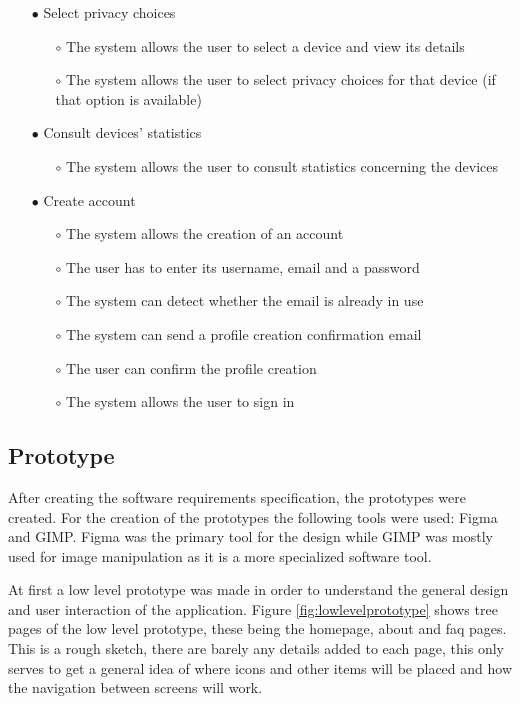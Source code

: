 \begin{itemize}
\begin{itemize}
    \end{itemize}
    \item[$\bullet$] Select privacy choices
    \begin{itemize}
        \item[$\circ$] The system allows the user to select a device and view its details
        \item[$\circ$] The system allows the user to select privacy choices for that device (if that option is available)
    \end{itemize}
    \item[$\bullet$] Consult devices' statistics
    \begin{itemize}
        \item[$\circ$] The system allows the user to consult statistics concerning the devices
    \end{itemize}
    \item[$\bullet$] Create account
    \begin{itemize}
        \item[$\circ$] The system allows the creation of an account
        \item[$\circ$] The user has to enter its username, email and a password
        \item[$\circ$] The system can detect whether the email is already in use
        \item[$\circ$] The system can send a profile creation confirmation email
        \item[$\circ$] The user can confirm the profile creation
        \item[$\circ$] The system allows the user to sign in
    \end{itemize}
\end{itemize}

\subsection{Prototype}

After creating the software requirements specification, the prototypes were
created. For the creation of the prototypes the following tools were used: Figma
and GIMP. Figma was the primary tool for the design while GIMP was mostly used
for image manipulation as it is a more specialized software tool.

At first a low level prototype was made in order to understand the
general design and user interaction of the application. Figure \ref{fig:lowlevelprototype}
shows tree pages of the low level prototype, these being the homepage, about
and faq pages. This is a rough sketch, there are barely any details added to each page,
this only serves to get a general idea of where icons and other items
will be placed and how the navigation between screens will work.

